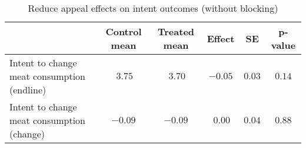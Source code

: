 \begin{table*}[ht]
\caption{Reduce appeal effects on intent outcomes (without blocking)\label{round}} 
\begin{center}
\begin{tabular}{lccccc}
\hline\hline
\multicolumn{1}{l}{}&\multicolumn{1}{c}{Control mean}&\multicolumn{1}{c}{Treated mean}&\multicolumn{1}{c}{Effect}&\multicolumn{1}{c}{SE}&\multicolumn{1}{c}{p-value}\tabularnewline
\hline
Intent to change meat consumption (endline)&$~3.75$&$~3.70$&$-0.05$&$0.03$&$0.14$\tabularnewline
Intent to change meat consumption (change)&$-0.09$&$-0.09$&$~0.00$&$0.04$&$0.88$\tabularnewline
\hline
\end{tabular}\end{center}

\end{table*}
